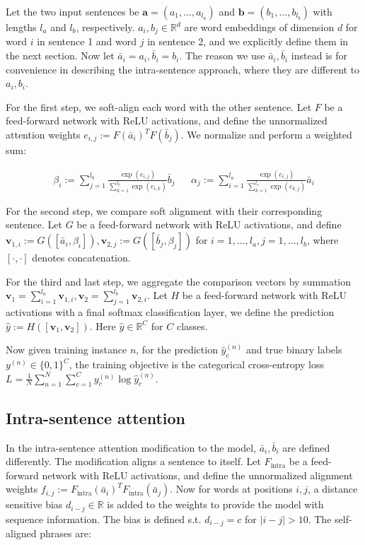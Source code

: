 \documentclass{article}
\begin{document}
Let the two input sentences be $\textbf{a}=(a_1,...,a_{l_a})$ and $\textbf{b}=(b_1,...,b_{l_b})$ with lengths $l_a$ and $l_b$, respectively. $a_i, b_j\in\mathbb{R}^d$ are word embeddings of dimension $d$ for word $i$ in sentence 1 and word $j$ in sentence 2, and we explicitly define them in the next section. Now let $\bar{a}_i = a_i, \bar{b}_i = b_i$. The reason we use $\bar{a}_i, \bar{b}_i$ instead is for convenience in describing the intra-sentence approach, where they are different to $a_i, b_i$.

For the first step, we soft-align each word with the other sentence. Let $F$ be a feed-forward network with ReLU activations, and define the unnormalized attention weights $e_{i,j} := F(\bar{a}_i)^T F(\bar{b}_j)$. We normalize and perform a weighted sum:

\begin{align*}
    \beta_i := \sum_{j=1}^{l_b} \frac{\exp(e_{i,j})}{\sum_{k=1}^{l_b}\exp(e_{i,k})} \bar{b}_j &&
    \alpha_j := \sum_{i=1}^{l_a} \frac{\exp(e_{i,j})}{\sum_{k=1}^{l_a}\exp(e_{k,j})} \bar{a}_i
\end{align*}

For the second step, we compare soft alignment with their corresponding sentence. Let $G$ be a feed-forward network with ReLU activations, and define $\mathbf{v}_{1,i} := G([\bar{a}_i, \beta_i]), \mathbf{v}_{2,j} := G([\bar{b}_j, \beta_j])$ for $i=1,...,l_a, j=1,...,l_b$, where $[\cdot, \cdot]$ denotes concatenation.

For the third and last step, we aggregate the comparison vectors by summation $\mathbf{v}_1 = \sum_{i=1}^{l_a}\mathbf{v}_{1,i}, \mathbf{v}_2 = \sum_{j=1}^{l_b}\mathbf{v}_{2,i}$. Let $H$ be a feed-forward network with ReLU activations with a final softmax classification layer, we define the prediction $\hat{y} := H([\mathbf{v}_1, \mathbf{v}_2])$. Here $\hat{y}\in\mathbb{R}^C$ for $C$ classes.

Now given training instance $n$, for the prediction $\hat{y}_c^{(n)}$ and true binary labels $y^{(n)}\in\{0, 1\}^C$, the training objective is the categorical cross-entropy loss $L = \frac{1}{N} \sum_{n=1}^N \sum_{c=1}^C y_c^{(n)} \log \hat{y}_c^{(n)}$.

\subsection{Intra-sentence attention}
In the intra-sentence attention modification to the model, $\bar{a}_i, \bar{b}_i$ are defined differently. The modification aligns a sentence to itself. Let $F_\text{intra}$ be a feed-forward network with ReLU activations, and define the unnormalized alignment weights $f_{i,j} := F_\text{intra}(\bar{a}_i)^T F_\text{intra}(\bar{a}_j)$. Now for words at positions $i, j$, a distance sensitive bias $d_{i-j}\in\mathbb{R}$ is added to the weights to provide the model with sequence information. The bias is defined s.t. $d_{i-j} = c$ for $|i-j| > 10$. The self-aligned phrases are:
\end{document}
